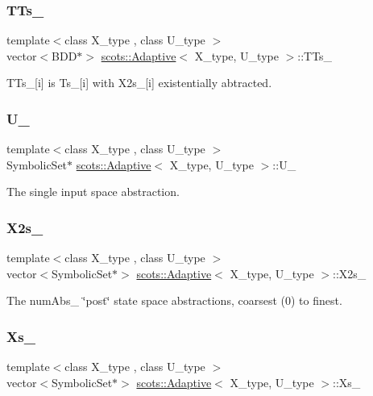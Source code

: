 \subsubsection{\texorpdfstring{T\+Ts\+\_\+}{TTs\_}}
{\footnotesize\ttfamily template$<$class X\+\_\+type , class U\+\_\+type $>$ \\
vector$<$B\+DD$\ast$$>$ \hyperlink{classscots_1_1Adaptive}{scots\+::\+Adaptive}$<$ X\+\_\+type, U\+\_\+type $>$\+::T\+Ts\+\_\+}

T\+Ts\+\_\+\mbox{[}i\mbox{]} is Ts\+\_\+\mbox{[}i\mbox{]} with X2s\+\_\+\mbox{[}i\mbox{]} existentially abtracted. \mbox{\label{classscots_1_1Adaptive_a89fa563cfea5b9a7bec6a705ca412a18}} 
\subsubsection{\texorpdfstring{U\+\_\+}{U\_}}
{\footnotesize\ttfamily template$<$class X\+\_\+type , class U\+\_\+type $>$ \\
Symbolic\+Set$\ast$ \hyperlink{classscots_1_1Adaptive}{scots\+::\+Adaptive}$<$ X\+\_\+type, U\+\_\+type $>$\+::U\+\_\+}

The single input space abstraction. \mbox{\label{classscots_1_1Adaptive_a532d1acf3db0235c7bbd551b41a040fc}} 
\subsubsection{\texorpdfstring{X2s\+\_\+}{X2s\_}}
{\footnotesize\ttfamily template$<$class X\+\_\+type , class U\+\_\+type $>$ \\
vector$<$Symbolic\+Set$\ast$$>$ \hyperlink{classscots_1_1Adaptive}{scots\+::\+Adaptive}$<$ X\+\_\+type, U\+\_\+type $>$\+::X2s\+\_\+}

The num\+Abs\+\_\+ \char`\"{}post\char`\"{} state space abstractions, coarsest (0) to finest. \mbox{\label{classscots_1_1Adaptive_ae43471177bc6b7d3229a9497b46ee343}} 
\subsubsection{\texorpdfstring{Xs\+\_\+}{Xs\_}}
{\footnotesize\ttfamily template$<$class X\+\_\+type , class U\+\_\+type $>$ \\
vector$<$Symbolic\+Set$\ast$$>$ \hyperlink{classscots_1_1Adaptive}{scots\+::\+Adaptive}$<$ X\+\_\+type, U\+\_\+type $>$\+::Xs\+\_\+}

